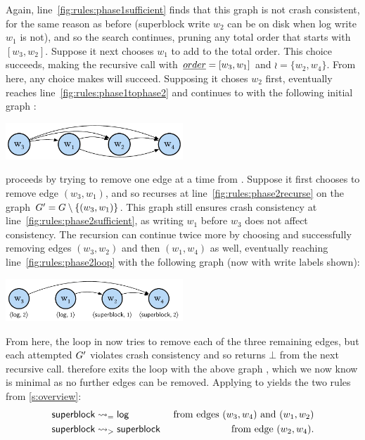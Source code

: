 \begin{example}
%
Again, line~\ref{fig:rules:phase1sufficient} finds that this graph is not crash consistent,
for the same reason as before (superblock write $w_2$ can be on disk when log write $w_1$ is not),
and so the search continues, pruning any total order that starts with $[w_3, w_2]$.
Suppose it next chooses $w_1$ to add to the total order.
This choice succeeds, making the recursive call with $\ord = [w_3, w_1]$ and $\wr = \{w_2, w_4\}$.
From here, any choice \phaseone makes will succeed.
Supposing it choses $w_2$ first,
\phaseone eventually reaches line~\ref{fig:rules:phase1tophase2} and continues to \phasetwo
with the following initial graph \gr:
%
\begin{center}\includegraphics[width=0.5\textwidth]{figs/sec4-3.pdf}\end{center}

\phasetwo proceeds by trying to remove one edge at a time from \gr.
Suppose it first chooses to remove edge $(w_3, w_1)$,
and so recurses at line~\ref{fig:rules:phase2recurse} on the graph $\gr' = \gr \setminus \{(w_3, w_1)\}$.
This graph still ensures crash consistency at line~\ref{fig:rules:phase2sufficient},
as writing $w_1$ before $w_3$ does not affect consistency.
The recursion can continue twice more
by choosing and successfully removing edges $(w_3, w_2)$ and then $(w_1, w_4)$ as well,
eventually reaching line~\ref{fig:rules:phase2loop} with the following graph \gr (now with write labels shown):\tighten
%
\begin{center}\includegraphics[width=0.5\textwidth]{figs/sec4-4.pdf}\end{center}
%
From here, the loop in \phasetwo now tries to remove each of the three remaining edges,
but each attempted $\gr'$ violates crash consistency and so returns $\bot$ from the next recursive call.
\phasetwo therefore exits the loop with the above graph \gr,
which we now know is minimal as no further edges can be removed.
Applying  to \gr yields the two rules from \cref{s:overview}:
\begin{align*}
    \deprule{\textsf{superblock}&}{\textsf{log}}{=} & \text{ from edges } (w_3, w_4) \text{ and } (w_1, w_2) \\
    \deprule{\textsf{superblock}&}{\textsf{superblock}}{>} & \text{ from edge } (w_2, w_4).
\end{align*}
\end{example}


